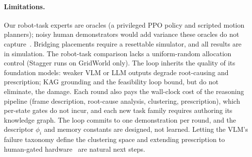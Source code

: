 \documentclass[letterpaper]{article} %
\begin{document}
\paragraph{Limitations.}
Our robot-task experts are oracles (a privileged PPO policy and scripted
motion planners); noisy human demonstrators would add variance these
oracles do not capture~\citep{mandlekar2020iwr,liu2023sirius}. Bridging placements require
a resettable simulator, and all results are in simulation. The robot-task
comparison lacks a uniform-random allocation control (Stagger runs on
GridWorld only). The loop inherits
the quality of its foundation models: weaker VLM or LLM outputs degrade
root-causing and prescription; KAG grounding and the feasibility loop
bound, but do not eliminate, the damage. Each round also pays the
wall-clock cost of the reasoning pipeline (frame description, root-cause
analysis, clustering, prescription), which per-state gates do not incur,
and each new task family requires authoring its knowledge graph. The loop
commits to one demonstration per round, and the descriptor $\phi_i$ and
memory constants are designed, not learned. Letting
the VLM's failure taxonomy define the clustering space and extending
prescription to human-gated hardware~\citep{kelly2019hgdagger} are natural
next steps.



\end{document}

